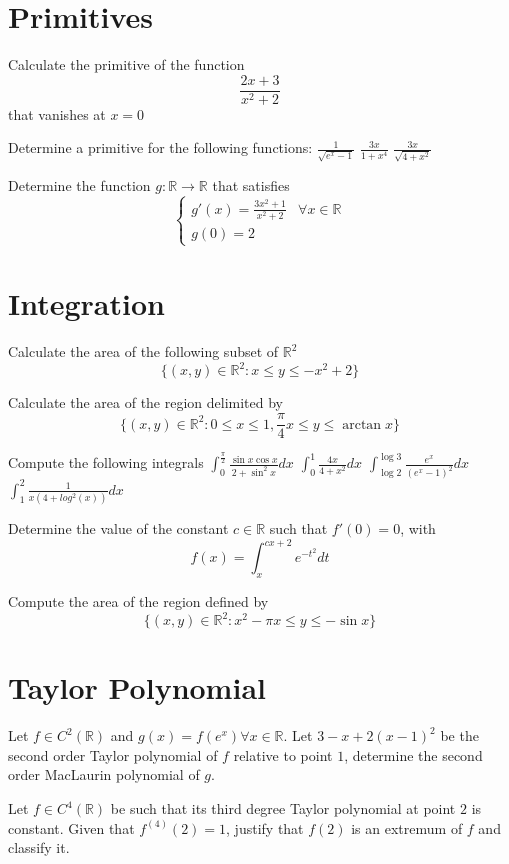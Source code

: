 \documentclass[12pt]{article}
\begin{document}
\section{Primitives}
\begin{ExerciseList}
	\Exercise Calculate the primitive of the function $$\frac{2x+3}{x^2+2}$$ that vanishes at $x=0$

	\Exercise Determine a primitive for the following functions:
	\Question $\frac{1}{\sqrt{e^x - 1}}$
	\Question $\frac{3x}{1+x^4}$
	\Question $\frac{3x}{\sqrt{4+x^2}}$

	\Exercise Determine the function $g\colon \mathbb R \to \mathbb R$ that satisfies
	$$\begin{cases}g'(x)=\frac{3x^2 + 1}{x^2 + 2} & \mbox{$\forall x\in \mathbb R$} \\ g(0)=2\end{cases}$$
\end{ExerciseList}

\section{Integration}
\begin{ExerciseList}
	\Exercise Calculate the area of the following subset of $\mathbb R^2$
	$$\{(x,y)\in\mathbb R^2 \colon x\le y\le -x^2+2\}$$

	\Exercise Calculate the area of the region delimited by
	$$\{ (x,y)\in\mathbb R^2 \colon 0\le x\le 1,\frac{\pi}{4}x\le y\le\arctan x \}$$

	\Exercise Compute the following integrals
	\Question $\int_0^{\frac{\pi}{2}}\frac{\sin x \cos x}{2+\sin^2x}dx$
	\Question $\int_0^1{\frac{4x}{4+x^2}}dx$
	\Question $\int_{\log 2}^{\log 3}{\frac{e^x}{(e^x-1)^2}}dx$
	\Question $\int_1^2{\frac{1}{x(4+log^2(x))}}dx$

	\Exercise Determine the value of the constant $c\in\mathbb R$ such that $f'(0) = 0$, with
	$$f(x)=\int_x^{cx+2}{e^{-t^2}}dt$$

	\Exercise Compute the area of the region defined by
	$$\{ (x,y)\in\mathbb R^2 \colon x^2-\pi x\le y \le -\sin{x} \}$$
\end{ExerciseList}

\section{Taylor Polynomial}
\begin{ExerciseList}
	\Exercise Let $f\in C^2(\mathbb R)$ and $g(x)=f(e^x)\forall x\in\mathbb R$.
	Let $3-x+2(x-1)^2$ be the second order Taylor polynomial of $f$ relative
	to point $1$, determine the second order MacLaurin polynomial of $g$.

	\Exercise Let $f\in C^4(\mathbb R)$ be such that its third degree Taylor
	polynomial at point $2$ is constant. Given that $f^{(4)}(2)=1$, justify that
	$f(2)$ is an extremum of $f$ and classify it.
\end{ExerciseList}
\end{document}
